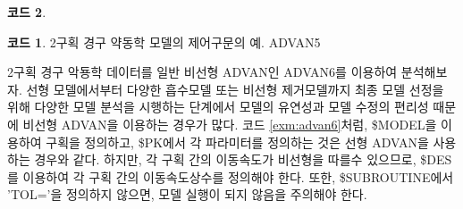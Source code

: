 \documentclass[
  10pt,
  krantz2,
  a4paper]{krantz}
\theoremstyle{definition}
\theoremstyle{definition}
\newtheorem{example}{코드}[chapter]
\theoremstyle{definition}
\theoremstyle{remark}
\begin{document}
\begin{example}
\begin{example}

\protect\hypertarget{exm:advan5}{}{\label{exm:advan5} }2구획 경구 약동학 모델의 제어구문의 예. ADVAN5

\end{example}
\end{example}

2구획 경구 악둉학 데이터를 일반 비선형 ADVAN인 ADVAN6를 이용하여 분석해보자. 선형 모델에서부터 다양한 흡수모델 또는 비선형 제거모델까지 최종 모델 선정을 위해 다양한 모델 분석을 시행하는 단계에서 모델의 유연성과 모델 수정의 편리성 때문에 비선형 ADVAN을 이용하는 경우가 많다. 코드 \ref{exm:advan6}처럼, \$MODEL을 이용하여 구획을 정의하고, \$PK에서 각 파라미터를 정의하는 것은 선형 ADVAN을 사용하는 경우와 같다. 하지만, 각 구획 간의 이동속도가 비선형을 따를수 있으므로, \$DES를 이용하여 각 구획 간의 이동속도상수를 정의해야 한다. 또한, \$SUBROUTINE에서 'TOL='을 정의하지 않으면, 모델 실행이 되지 않음을 주의해야 한다.
\end{document}
